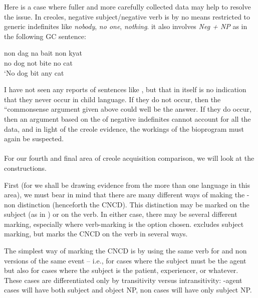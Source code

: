 Here is a case where fuller and more carefully collected data may help to resolve the issue. In creoles, negative subject/negative verb is by no means restricted to generic indefinites like \textit{nobody}, \textit{no one}, \textit{nothing}. it also involves \textit{Neg + NP} as in the following GC sentence:

\ea\label{ex:3:64}
\gll non dag na bait non kyat\\
no dog not bite no cat\\
\glt `No dog bit any cat
\z


\noindent I have not seen any reports of sentences like , but that in itself is no indication that they never occur in child language. If they do not occur, then the ``commonsense argument given above could well be the answer. If they do occur, then an argument based on the  of negative indefinites cannot account for all the data, and in light of the creole evidence, the workings of the bioprogram must again be suspected.\\\\

For our fourth and final area of creole acquisition comparison, we will look at the   constructions.

First (for we shall be drawing evidence from the  more than one language in this area), we must bear in mind that there are many different ways of making the -non dis\-tinction (henceforth the CNCD). This distinction may be marked on the subject (as in ) or on the verb. In either case, there may be several different  marking, especially where verb-marking is the option chosen.  excludes subject marking, but marks the CNCD on the verb in several ways.

The simplest way of marking the CNCD is by using the same verb for  and non versions of the same event -- i.e., for cases where the subject must be the  agent but also for cases where the subject is the patient, experiencer, or whatever. These cases are differentiated only by transitivity versus intransitivity: -agent cases will have both subject and object NP, non cases will have only subject NP.

